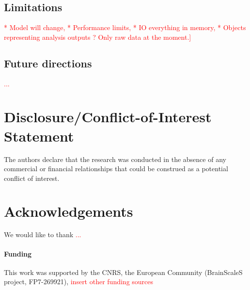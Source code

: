 \documentclass{frontiers}
\newcommand{\missing}[1]{\textcolor{red}{#1}}
\begin{document}
\subsection{Limitations}
\missing{* Model will change, * Performance limits, * IO everything in memory, * Objects representing analysis outputs ? Only raw data at the moment.]}


\subsection{Future directions}

\missing{...}


\section*{Disclosure/Conflict-of-Interest Statement}
The authors declare that the research was conducted in the absence of any commercial or financial relationships that could be construed as a potential conflict of interest.

\section*{Acknowledgements}
We would like to thank \missing{...}

\paragraph{Funding\textcolon} This work was supported by the CNRS, the European Community (BrainScaleS project, FP7-269921), \missing{insert other funding sources}



\end{document}

